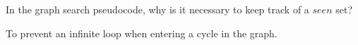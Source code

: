 \question In the graph search pseudocode, why is it necessary to keep track of
a $seen$ set?

\begin{solution}[0.5in]
To prevent an infinite loop when entering a cycle in the graph.
\end{solution}

